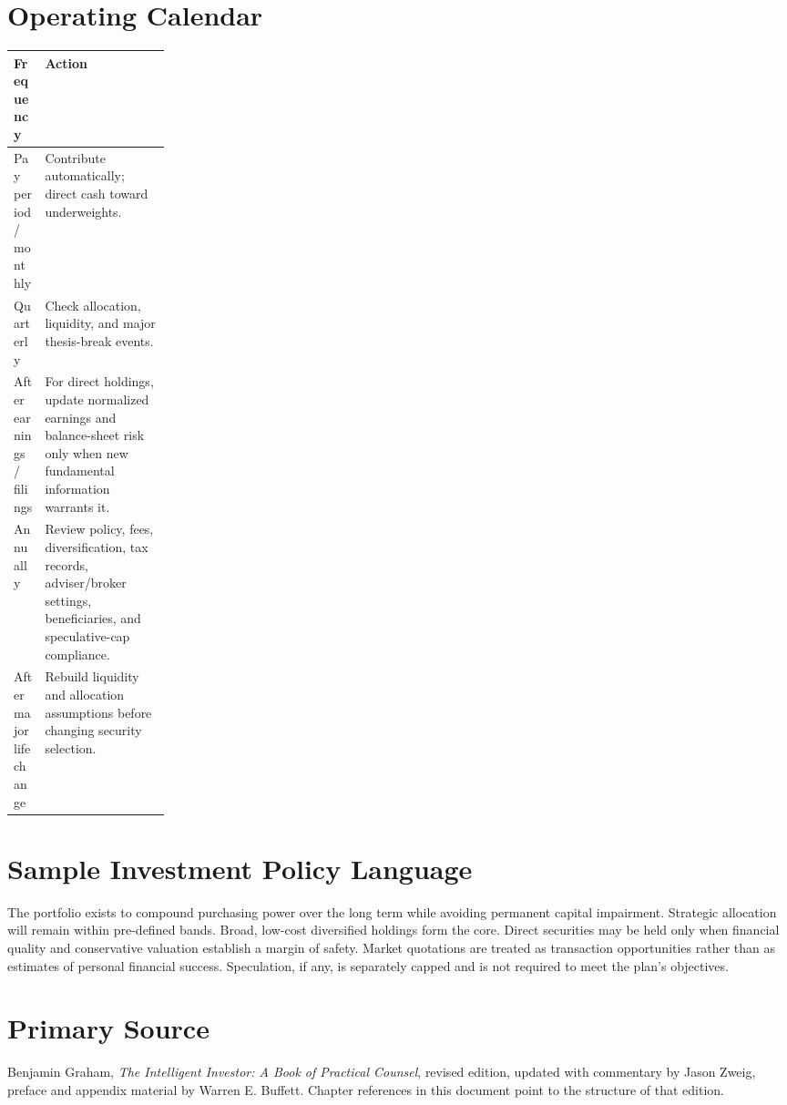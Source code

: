 \documentclass[11pt]{article}
\begin{document}
\section{Operating Calendar}
\begin{center}
\begin{tabularx}{\linewidth}{@{}>{\raggedright\arraybackslash}p{0.20\linewidth}Y@{}}
\toprule
\textbf{Frequency} & \textbf{Action}\\
\midrule
Pay period / monthly & Contribute automatically; direct cash toward underweights.\\
Quarterly & Check allocation, liquidity, and major thesis-break events.\\
After earnings / filings & For direct holdings, update normalized earnings and balance-sheet risk only when new fundamental information warrants it.\\
Annually & Review policy, fees, diversification, tax records, adviser/broker settings, beneficiaries, and speculative-cap compliance.\\
After major life change & Rebuild liquidity and allocation assumptions before changing security selection.\\
\bottomrule
\end{tabularx}
\end{center}

\section{Sample Investment Policy Language}
\begin{modernbox}
The portfolio exists to compound purchasing power over the long term while avoiding permanent capital impairment. Strategic allocation will remain within pre-defined bands. Broad, low-cost diversified holdings form the core. Direct securities may be held only when financial quality and conservative valuation establish a margin of safety. Market quotations are treated as transaction opportunities rather than as estimates of personal financial success. Speculation, if any, is separately capped and is not required to meet the plan's objectives.
\end{modernbox}

\section*{Primary Source}
Benjamin Graham, \textit{The Intelligent Investor: A Book of Practical Counsel}, revised edition, updated with commentary by Jason Zweig, preface and appendix material by Warren E. Buffett. Chapter references in this document point to the structure of that edition.
\end{document}
